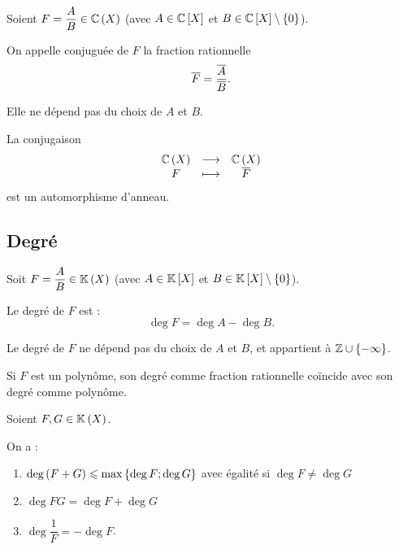 \begin{defi}[Conjugaison]~\\
Soient \(F=\dfrac{A}{B}\in\fracrat[\C]\) (avec \(A\in\poly[\C]\) et \(B\in\poly[\C]\excluant\accol{0}\)).

On appelle conjuguée de \(F\) la fraction rationnelle \[\overline{F}=\dfrac{\overline{A}}{\overline{B}}.\]

Elle ne dépend pas du choix de \(A\) et \(B\).
\end{defi}

\begin{prop}
La conjugaison \[\fonctionlambda{\fracrat[\C]}{\fracrat[\C]}{F}{\conj{F}}\] est un automorphisme d'anneau.
\end{prop}

\begin{dem}
\end{dem}

\subsection{Degré}

\begin{defi}
Soit \(F=\dfrac{A}{B}\in\fracrat\) (avec \(A\in\poly\) et \(B\in\poly\excluant\accol{0}\)).

Le degré de \(F\) est : \[\deg F=\deg A-\deg B.\]

Le degré de \(F\) ne dépend pas du choix de \(A\) et \(B\), et appartient à \(\mathbb{Z}\cup\left\lbrace-\infty\right\rbrace\).

Si \(F\) est un polynôme, son degré comme fraction rationnelle coïncide avec son degré comme polynôme.
\end{defi}

\begin{prop}
Soient \(F,G\in\fracrat\).

On a :

\begin{enumerate}
\item \(\deg\left(F+G\right)\leqslant\max\left\lbrace\deg F;\deg G\right\rbrace\) avec égalité si \(\deg F\not=\deg G\) \\

\item \(\deg FG=\deg F+\deg G\) \\

\item \(\deg\dfrac{1}{F}=-\deg F\).
\end{enumerate}
\end{prop}

